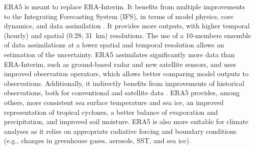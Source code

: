 \documentclass[alpha-refs]{wiley-article}
\begin{document}
ERA5 \citep{Hersbach2019} is meant to replace ERA-Interim. It benefits from multiple improvements to the Integrating Forecasting System (IFS), in terms of model physics, core dynamics, and data assimilation \citep{Hersbach2019}. It provides more outputs, with higher temporal (hourly) and spatial (0.28\degree; 31~km) resolutions. The use of a 10-members ensemble of data assimilations at a lower spatial and temporal resolution allows an estimation of the uncertainty. ERA5 assimilates significantly more data than ERA-Interim, such as ground-based radar and new satellite sensors, and uses improved observation operators, which allows better comparing model outputs to observations. Additionally, it indirectly benefits from improvements of historical observations, both for conventional and satellite data \citep{Hersbach2019}. ERA5 provides, among others, more consistent sea surface temperature and sea ice, an improved representation of tropical cyclones, a better balance of evaporation and precipitation, and improved soil moisture. ERA5 is also more suitable for climate analyses as it relies on appropriate radiative forcing and boundary conditions (e.g., changes in greenhouse gases, aerosols, SST, and sea ice).
\end{document}
